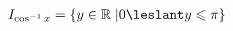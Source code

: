 \documentclass[preview]{standalone}
\begin{document}
\begin{align*}
I_{\cos^{-1}x} = \{ y \in \mathbb{R} \; | 0 \leslant y \leqslant \pi \}
\end{align*}
\end{document}
